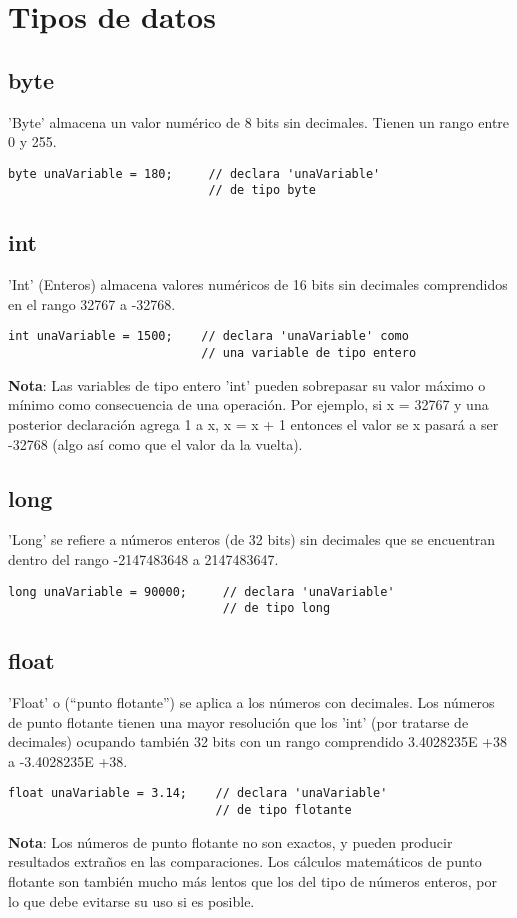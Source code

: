 \chapter{Tipos de datos}
\section{byte}

'Byte' almacena un valor numérico de 8 bits sin decimales. Tienen un rango entre 0 y 255.
\begin{lstlisting}
byte unaVariable = 180;     // declara 'unaVariable'
                            // de tipo byte
\end{lstlisting}
\section{int}

'Int' (Enteros) almacena valores numéricos de 16 bits sin decimales comprendidos en el rango 32767 a -32768.
\begin{lstlisting}
int unaVariable = 1500;    // declara 'unaVariable' como
                           // una variable de tipo entero
\end{lstlisting}
\textbf{Nota}: Las variables de tipo entero 'int' pueden sobrepasar su valor máximo o mínimo como consecuencia de una operación. Por ejemplo, si x = 32767 y una posterior declaración agrega 1 a x, x = x + 1 entonces el valor se x pasará a ser -32768 (algo así como que el valor da la vuelta).
\section{long}

'Long' se refiere a números enteros (de 32 bits) sin decimales que se encuentran dentro del rango -2147483648 a 2147483647.
\begin{lstlisting}
long unaVariable = 90000;     // declara 'unaVariable'
                              // de tipo long
\end{lstlisting}
\section{float}

'Float' o (“punto flotante”) se aplica a los números con decimales. Los números de punto flotante tienen una mayor resolución que los 'int' (por tratarse de decimales) ocupando también 32 bits con un rango comprendido 3.4028235E +38 a -3.4028235E +38.
\begin{lstlisting}
float unaVariable = 3.14;    // declara 'unaVariable'
                             // de tipo flotante
\end{lstlisting}
\textbf{Nota}: Los números de punto flotante no son exactos, y pueden producir resultados extraños en las comparaciones. Los cálculos matemáticos de punto flotante son también mucho más lentos que los del tipo de números enteros, por lo que debe evitarse su uso si es posible.
